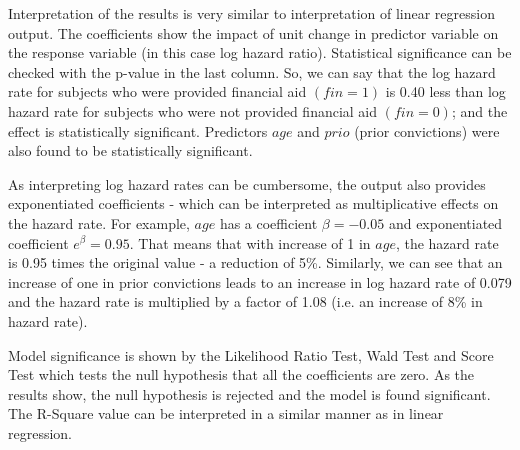 \documentclass[10pt, letterpaper, twoside]{memoir}\usepackage{knitr}
\begin{document}
Interpretation of the results is very similar to interpretation of linear regression output. The coefficients show the impact of unit change in predictor variable on the response variable (in this case log hazard ratio). Statistical significance can be checked with the p-value in the last column. So, we can say that the log hazard rate for subjects who were provided financial aid $(fin = 1)$ is 0.40 less than log hazard rate for subjects who were not provided financial aid $(fin = 0)$; and the effect is statistically significant. Predictors $age$ and $prio$ (prior convictions) were also found to be statistically significant. 

As interpreting log hazard rates can be cumbersome, the output also provides exponentiated coefficients - which can be interpreted as multiplicative effects on the hazard rate. For example, $age$ has a coefficient $\beta = -0.05$ and exponentiated coefficient $e^\beta = 0.95$. That means that with increase of 1 in $age$, the hazard rate is 0.95 times the original value - a reduction of 5\%. Similarly, we can see that an increase of one in prior convictions leads to an increase in log hazard rate of 0.079 and the hazard rate is multiplied by a factor of 1.08 (i.e. an increase of 8\% in hazard rate).

Model significance is shown by the Likelihood Ratio Test, Wald Test and Score Test which tests the null hypothesis that all the coefficients are zero. As the results show, the null hypothesis is rejected and the model is found significant. The R-Square value can be interpreted in a similar manner as in linear regression.
\end{document}
